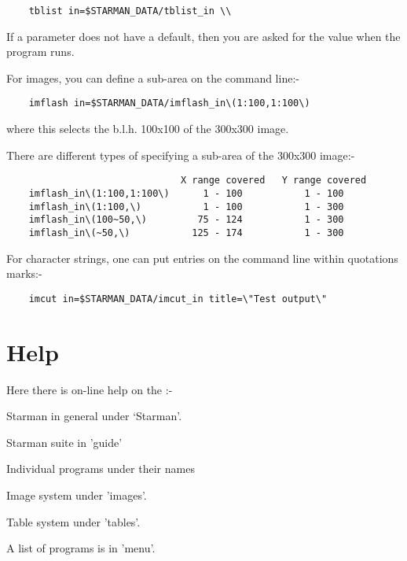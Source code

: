 \begin{verbatim}
    tblist in=$STARMAN_DATA/tblist_in \\ \end{verbatim}

 If a parameter does not have a default, then you are asked for the
 value when the program runs.

\vspace*{2mm}

 For images, you can define a sub-area on the command line:-

\begin{verbatim}
    imflash in=$STARMAN_DATA/imflash_in\(1:100,1:100\) \end{verbatim}

 where this selects the b.l.h. 100x100 of the 300x300 image.

 There are different types of specifying a sub-area of the 300x300
 image:-

\begin{verbatim}
                               X range covered   Y range covered
    imflash_in\(1:100,1:100\)      1 - 100           1 - 100
    imflash_in\(1:100,\)           1 - 100           1 - 300
    imflash_in\(100~50,\)         75 - 124           1 - 300
    imflash_in\(~50,\)           125 - 174           1 - 300
\end{verbatim}

\vspace*{2mm}

 For character strings, one can put entries on the command line within
 quotations marks:-

\begin{verbatim}
    imcut in=$STARMAN_DATA/imcut_in title=\"Test output\"
\end{verbatim}





\section{Help} 


  Here there is on-line help on the :-

\begin{list}{{-}}{} \item Starman in general under `Starman'.  \item
Starman suite in 'guide' \item Individual programs under their names
\item Image system under 'images'.  \item Table system under 'tables'.
\item A list of programs is in 'menu'.  \end{list}

